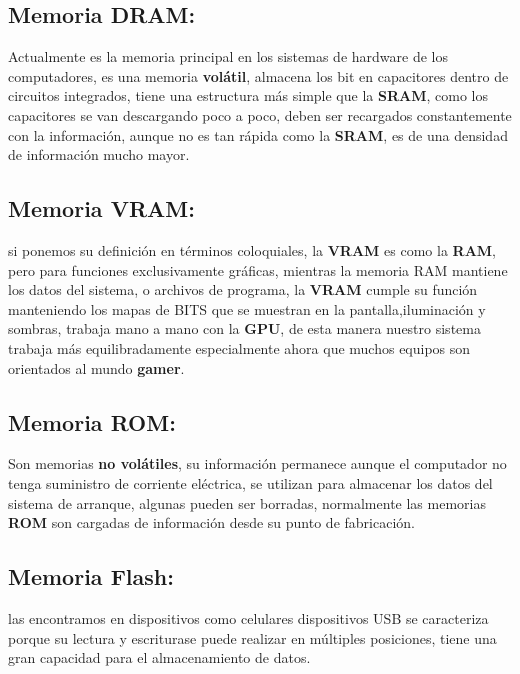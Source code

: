 \documentclass{article}
\begin{document}
\subsection{Memoria DRAM:}

Actualmente es la memoria principal en los sistemas de hardware de los computadores, es una memoria \textbf{volátil}, almacena los bit en capacitores dentro de circuitos integrados,\cite{uaslpwebsite} tiene una estructura más simple que la \textbf{SRAM}, como los capacitores se van descargando poco a poco, deben ser recargados constantemente con la información, aunque no es tan rápida como la \textbf{SRAM}, es de una densidad de información mucho mayor.

\subsection{Memoria VRAM:}

si ponemos su definición en términos coloquiales, la \textbf{VRAM} es como la \textbf{RAM}, pero para funciones exclusivamente gráficas, mientras la memoria RAM mantiene los datos del sistema, o archivos de programa, la \textbf{VRAM} cumple su función manteniendo los mapas de BITS\cite{upvwebsite} que se muestran en la pantalla,iluminación y sombras, trabaja mano a mano con la \textbf{GPU}, de esta manera nuestro sistema trabaja más equilibradamente especialmente ahora que muchos equipos son orientados al mundo \textbf{gamer}.

\subsection{Memoria ROM:}

Son memorias \textbf{no volátiles}, su información permanece aunque el computador no  tenga suministro de corriente eléctrica, se utilizan para almacenar los datos del sistema de arranque,\cite{Pablo} algunas pueden ser borradas, normalmente las memorias \textbf{ROM} son cargadas de información desde su punto de fabricación.

\subsection{Memoria Flash:}

las encontramos en dispositivos como celulares dispositivos USB se caracteriza porque su lectura y escriturase puede realizar en múltiples posiciones, tiene una gran capacidad para el almacenamiento de datos.\cite{Claudia}
\end{document}
